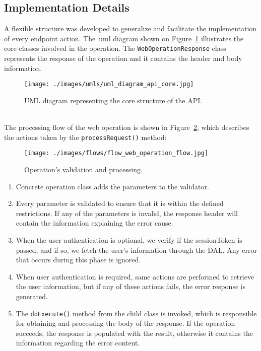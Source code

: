 \subsection{Implementation Details}
\label{sec:apiImplementation}
A flexible structure was developed to generalize and facilitate the implementation of every endpoint action. The~\gls{uml} diagram shown on Figure~\ref{fig:umlAPICore} illustrates the core classes involved in the operation. The \verb"WebOperationResponse" class represents the response of the operation and it contains the header and body information.
\begin{figure}[h!]
 \centering
   \texttt{[image: ./images/umls/uml\_diagram\_api\_core.jpg]}
   \caption{UML diagram representing the core structure of the API.}
   \label{fig:umlAPICore}
\end{figure}
\\
The processing flow of the web operation is shown in Figure~\ref{fig:webOperationFlow}, which describes the actions taken by the  \verb"processRequest()" method:
\begin{figure}[h!]
 \centering
   \texttt{[image: ./images/flows/flow\_web\_operation\_flow.jpg]}
   \caption{Operation's validation and processing.}
   \label{fig:webOperationFlow}
\end{figure}
\begin{enumerate}
\item Concrete operation class adds the parameters to the validator.
\item Every parameter is validated to ensure that it is within the defined restrictions. If any of the parameters is invalid, the response header will contain the information explaining the error cause.
\item When the user authentication is optional, we verify if the sessionToken is passed, and if so, we fetch the user's information through the DAL. Any error that occurs during this phase is ignored. 
\item When user authentication is required, same actions are performed to retrieve the user information, but if any of these actions fails, the error response is generated.
\item The \verb"doExecute()" method from the child class is invoked, which is responsible for obtaining and processing the body of the response. If the operation succeeds, the response is populated with the result, otherwise it contains the information regarding the error content.
\end{enumerate}

